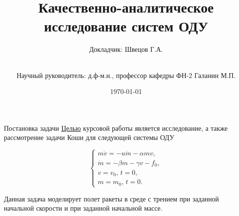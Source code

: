 \documentclass{beamer}
\title[Качественно-аналитическое...]{Качественно-аналитическое исследование систем ОДУ}
\author[Швецов Г.А.]{Докладчик: Швецов Г.А.\and\\[0.5mm] Научный руководитель: д.ф-м.н., профессор кафедры ФН-2 Галанин М.П.}
\institute[каф. Прикладная математика ФН-2]{группа ФН2-42Б}
\date{\today}
\begin{document}
	
	\begin{frame}[plain]
		\maketitle
	\end{frame}
	
	\begin{frame}{Постановка задачи}
\underline{Целью} курсовой работы является исследование, а также рассмотрение задачи Коши для следующей системы ОДУ		
\begin{block}{}
\begin{equation}
	\begin{cases}
	m\dot v=-u\dot m-\alpha m v, \\
	\dot m=-\beta m-\gamma v-f_0, \\
	v=v_0,\,t=0,\\
	m=m_0,\,t=0.
\end{cases}
\label{system1}
\end{equation}
\end{block}
	Данная задача моделирует полет ракеты в среде с трением при заданной начальной скорости и при заданной начальной массе.
	\end{frame}
\end{document}
